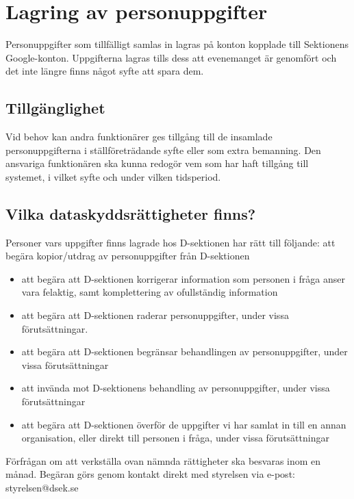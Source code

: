 \documentclass{dsekprotokoll}
\begin{document}
\section{Lagring av personuppgifter}
Personuppgifter som tillfälligt samlas in lagras på konton kopplade till Sektionens Google-konton. Uppgifterna lagras tills dess att evenemanget är genomfört och det inte längre finns något syfte att spara dem.

\subsection{Tillgänglighet}

Vid behov kan andra funktionärer ges tillgång
till de insamlade personuppgifterna i ställföreträdande syfte eller som extra bemanning. Den ansvariga funktionären ska kunna
redogör vem som har haft tillgång till systemet, i vilket syfte och under vilken tidsperiod.

\subsection{Vilka dataskyddsrättigheter finns?}
Personer vars uppgifter finns lagrade hos D-sektionen har rätt till följande:
att begära kopior/utdrag av personuppgifter från D-sektionen

\begin{itemize}
    \item att begära att D-sektionen korrigerar information som personen i fråga anser vara felaktig, samt komplettering av ofullständig information

    \item att begära att D-sektionen raderar personuppgifter, under vissa förutsättningar.

    \item att begära att D-sektionen begränsar behandlingen av personuppgifter, under vissa förutsättningar

    \item att invända mot D-sektionens behandling av personuppgifter, under vissa förutsättningar

    \item att begära att D-sektionen överför de uppgifter vi har samlat in till en annan organisation, eller direkt till personen i fråga, under vissa förutsättningar

\end{itemize}

Förfrågan om att verkställa ovan nämnda rättigheter ska besvaras inom en månad. Begäran görs genom kontakt direkt med styrelsen via e-post: styrelsen@dsek.se
\end{document}
